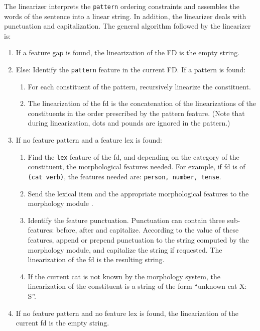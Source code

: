 \documentclass[10pt,a4paper]{report}
\begin{document}
The linearizer interprets the {\tt pattern} ordering constraints and
assembles the words of the sentence into a linear string.  In addition, the
linearizer deals with punctuation and capitalization.  The general
algorithm followed by the linearizer is:
\begin{enumerate}
\item If a feature gap is found, the linearization of the FD is the empty string.

\item Else: Identify the {\tt pattern} feature in the current FD.
If a pattern is found:
\begin{enumerate}
\item For each constituent of the pattern, recursively linearize the constituent.

\item The linearization of the fd is the concatenation of the linearizations of
the constituents in the order prescribed by the pattern feature. (Note that
during linearization, dots and pounds are ignored in the pattern.)
\end{enumerate}

\item If no feature pattern and a feature lex is found:
\begin{enumerate}
\item Find the {\tt lex} feature of the fd, and depending on the category of the
constituent, the morphological features needed.  For example, if fd is of
{\tt (cat verb)}, the features needed are: {\tt person, number, tense}.  

\item Send the lexical item and the appropriate morphological features to the
morphology module .  

\item Identify the feature punctuation. Punctuation can contain three
sub-features: before, after and capitalize.  According to the value of
these features, append or prepend punctuation to the string computed by the
morphology module, and capitalize the string if requested.
The linearization of the fd is the resulting string.

\item If the current cat is not known by the morphology system, the linearization
of the constituent is a string of the form ``unknown cat X: S''.
\end{enumerate}

\item If no feature pattern and no feature lex is found, the linearization of the
current fd is the empty string.
\end{enumerate}
\end{document}
